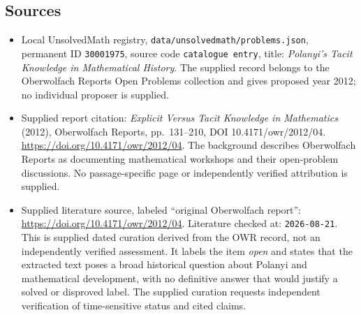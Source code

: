 \documentclass[11pt]{article}
\begin{document}
\subsection{Sources}
\begin{itemize}
\item Local UnsolvedMath registry, \texttt{data/unsolvedmath/problems.json}, permanent ID \texttt{30001975}, source code \texttt{catalogue entry}, title: \emph{Polanyi's Tacit Knowledge in Mathematical History}. The supplied record belongs to the Oberwolfach Reports Open Problems collection and gives proposed year 2012; no individual proposer is supplied.
\item Supplied report citation: \emph{Explicit Versus Tacit Knowledge in Mathematics} (2012), Oberwolfach Reports, pp.~131--210, DOI 10.4171/owr/2012/04. \url{https://doi.org/10.4171/owr/2012/04}. The background describes Oberwolfach Reports as documenting mathematical workshops and their open-problem discussions. No passage-specific page or independently verified attribution is supplied.
\item Supplied literature source, labeled ``original Oberwolfach report'': \url{https://doi.org/10.4171/owr/2012/04}. Literature checked at: \texttt{2026-08-21}. This is supplied dated curation derived from the OWR record, not an independently verified assessment. It labels the item \emph{open} and states that the extracted text poses a broad historical question about Polanyi and mathematical development, with no definitive answer that would justify a solved or disproved label. The supplied curation requests independent verification of time-sensitive status and cited claims.
\end{itemize}
\end{document}
